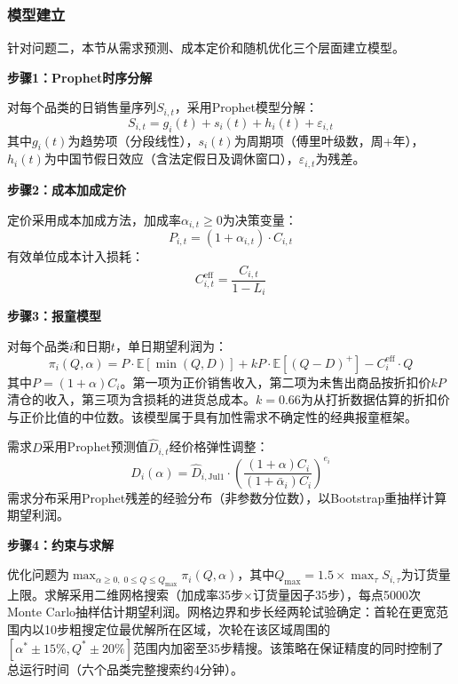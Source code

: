 
\subsubsection{模型建立}

针对问题二，本节从需求预测、成本定价和随机优化三个层面建立模型。

\textbf{步骤1：Prophet时序分解}

对每个品类的日销售量序列$S_{i,t}$，采用Prophet模型\cite{Taylor2018}分解：
\begin{equation}
  S_{i,t} = g_i(t) + s_i(t) + h_i(t) + \varepsilon_{i,t}
\end{equation}
其中$g_i(t)$为趋势项（分段线性），$s_i(t)$为周期项（傅里叶级数，周+年），$h_i(t)$为中国节假日效应（含法定假日及调休窗口），$\varepsilon_{i,t}$为残差。

\textbf{步骤2：成本加成定价}

定价采用成本加成方法，加成率$\alpha_{i,t} \geq 0$为决策变量：
\begin{equation}
  P_{i,t} = (1 + \alpha_{i,t}) \cdot C_{i,t}
\end{equation}
有效单位成本计入损耗：
\begin{equation}
  C_{i,t}^{\text{eff}} = \frac{C_{i,t}}{1 - L_i}
\end{equation}

\textbf{步骤3：报童模型}

对每个品类$i$和日期$t$，单日期望利润为：
\begin{equation}
  \pi_i(Q, \alpha) = P \cdot \mathbb{E}[\min(Q, D)] + kP \cdot \mathbb{E}[(Q - D)^+] - C_i^{\text{eff}} \cdot Q
\end{equation}
其中$P = (1+\alpha)C_i$。第一项为正价销售收入，第二项为未售出商品按折扣价$kP$清仓的收入，第三项为含损耗的进货总成本。$k=0.66$为从打折数据估算的折扣价与正价比值的中位数。该模型属于具有加性需求不确定性的经典报童框架\cite{Dana2001,Qin2011}。

需求$D$采用Prophet预测值$\hat{D}_{i,t}$经价格弹性调整：
\begin{equation}
  D_i(\alpha) = \hat{D}_{i,\text{Jul1}} \cdot \left(\frac{(1+\alpha)C_i}{(1+\bar{\alpha}_i)C_i}\right)^{e_i}
\end{equation}
需求分布采用Prophet残差的经验分布（非参数分位数），以Bootstrap重抽样计算期望利润。

\textbf{步骤4：约束与求解}

优化问题为$\max_{\alpha \geq 0,\; 0 \leq Q \leq Q_{\max}} \pi_i(Q, \alpha)$，其中$Q_{\max} = 1.5 \times \max_\tau S_{i,\tau}$为订货量上限。求解采用二维网格搜索（加成率35步$\times$订货量因子35步），每点5000次Monte Carlo抽样估计期望利润。网格边界和步长经两轮试验确定：首轮在更宽范围内以10步粗搜定位最优解所在区域，次轮在该区域周围的$[\alpha^* \pm 15\%, Q^* \pm 20\%]$范围内加密至35步精搜。该策略在保证精度的同时控制了总运行时间（六个品类完整搜索约4分钟）。

